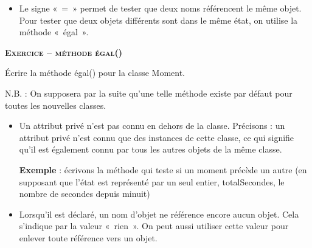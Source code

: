 \begin{itemize}
	\item 
		Le signe «~=~» permet de tester que deux noms référencent le même objet.
		Pour tester que deux objets différents sont dans le même état, on
		utilise la méthode «~égal~».
		\\
		\bigskip
\end{itemize}

\bigskip

{\sffamily\bfseries\scshape
Exercice – méthode égal()}

Écrire la méthode égal() pour la classe Moment.

\bigskip

N.B. : On supposera par la suite qu'une telle méthode
existe par défaut pour toutes les nouvelles classes.

\liststyleListv
\begin{itemize}
	\item {
		Un attribut privé n'est pas connu en dehors de la
		classe. Précisons : un attribut privé n'est connu que
		des instances de cette classe, ce qui signifie qu'il
		est également connu par tous les autres objets de la même
		classe.

		\textbf{Exemple} : écrivons la méthode qui teste si un moment précède un
		autre (en supposant que l'état est représenté par un
		seul entier, totalSecondes, le nombre de secondes depuis minuit)
		\\
		\bigskip
		\bigskip
		}
	\item {
		Lorsqu'il est déclaré, un nom d'objet
		ne référence encore aucun objet. Cela s'indique par la
		valeur «~rien~». On peut aussi utiliser cette valeur pour enlever toute
		référence vers un objet.
		\\
		\bigskip
		}
\end{itemize}
	


